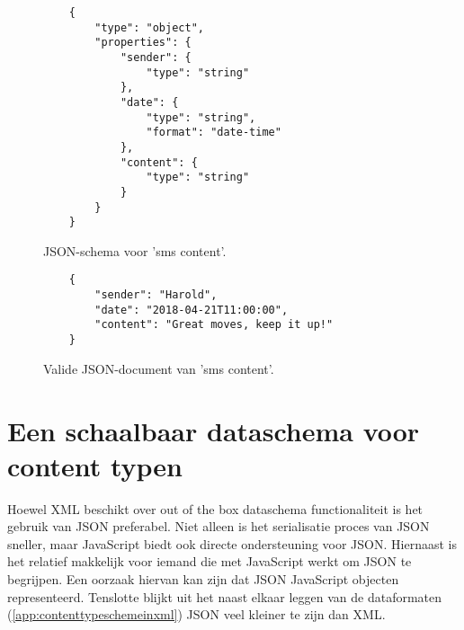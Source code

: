 \begin{figure}[htb]
    \centering
    \lstset{language=JSON}
    \begin{lstlisting}
    {
        "type": "object",
        "properties": {
            "sender": {
                "type": "string"
            },
            "date": {
                "type": "string",
                "format": "date-time"
            },
            "content": {
                "type": "string"
            }
        }
    }             
    \end{lstlisting}
    \caption{JSON-schema voor 'sms content'.}
    \label{fig:jsonschemasmscontent}
\end{figure}

\begin{figure}[htb]
    \centering
    \lstset{language=JSON}
    \begin{lstlisting}
    {
        "sender": "Harold",
        "date": "2018-04-21T11:00:00",
        "content": "Great moves, keep it up!"
    }                   
    \end{lstlisting}
    \caption{Valide JSON-document van 'sms content'.}
    \label{fig:jsonsmscontent}
\end{figure}

\pagebreak
\section{Een schaalbaar dataschema voor content typen}
Hoewel XML beschikt over out of the box dataschema functionaliteit is het gebruik van JSON preferabel. Niet alleen is het serialisatie proces van JSON sneller\cite{Nurseitov}, maar JavaScript biedt ook directe ondersteuning voor JSON. Hiernaast is het relatief makkelijk voor iemand die met JavaScript werkt om JSON te begrijpen. Een oorzaak hiervan kan zijn dat JSON JavaScript objecten representeerd. Tenslotte blijkt uit het naast elkaar leggen van de dataformaten (\autoref{app:contenttypeschemeinxml}) JSON veel kleiner te zijn dan XML.

